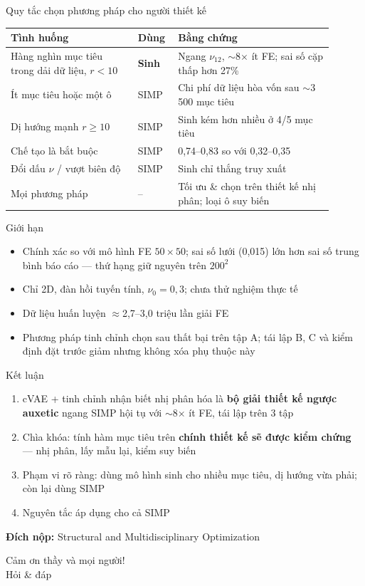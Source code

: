 \documentclass[aspectratio=169,11pt]{beamer}
\newcommand{\nuot}{\nu_{12}}
\begin{document}
\begin{frame}{Quy tắc chọn phương pháp cho người thiết kế}
  \centering
  \begin{tabular}{p{0.36\linewidth}p{0.1\linewidth}p{0.44\linewidth}}
    \toprule
    Tình huống & Dùng & Bằng chứng\\
    \midrule
    Hàng nghìn mục tiêu trong dải dữ liệu, $r<10$
      & \textbf{Sinh} & Ngang $\nuot$, $\sim$8$\times$ ít FE; sai số cặp thấp hơn 27\%\\
    Ít mục tiêu hoặc một ô & SIMP & Chi phí dữ liệu hòa vốn sau
      $\sim$3\,500 mục tiêu\\
    Dị hướng mạnh $r\ge10$ & SIMP & Sinh kém hơn nhiều ở 4/5 mục tiêu\\
    Chế tạo là bắt buộc & SIMP & 0,74--0,83 so với 0,32--0,35\\
    Đổi dấu $\nu$ / vượt biên độ & SIMP & Sinh chỉ thắng truy xuất\\
    Mọi phương pháp & -- & Tối ưu \& chọn trên thiết kế nhị phân; loại ô
      suy biến\\
    \bottomrule
  \end{tabular}
\end{frame}

\begin{frame}{Giới hạn}
  \begin{itemize}
    \item Chính xác so với mô hình FE $50\times50$; sai số lưới (0,015) lớn
      hơn sai số trung bình báo cáo --- thứ hạng giữ nguyên trên $200^2$
    \item Chỉ 2D, đàn hồi tuyến tính, $\nu_0=0{,}3$; chưa thử nghiệm thực tế
    \item Dữ liệu huấn luyện $\approx$2,7--3,0 triệu lần giải FE
    \item Phương pháp tinh chỉnh chọn sau thất bại trên tập A; tái lập B, C
      và kiểm định đặt trước giảm nhưng không xóa phụ thuộc này
  \end{itemize}
\end{frame}

\begin{frame}{Kết luận}
  \begin{enumerate}
    \item cVAE + tinh chỉnh nhận biết nhị phân hóa là \textbf{bộ giải thiết kế
      ngược auxetic} ngang SIMP hội tụ với $\sim$8$\times$ ít FE, tái lập trên
      3 tập
    \item Chìa khóa: tính hàm mục tiêu trên \textbf{chính thiết kế sẽ được
      kiểm chứng} --- nhị phân, lấy mẫu lại, kiểm suy biến
    \item Phạm vi rõ ràng: dùng mô hình sinh cho nhiều mục tiêu, dị hướng
      vừa phải; còn lại dùng SIMP
    \item Nguyên tắc áp dụng cho cả SIMP
  \end{enumerate}
  \vspace{4mm}
  \textbf{Đích nộp:} Structural and Multidisciplinary Optimization
\end{frame}

\begin{frame}
  \centering
  \vfill
  {\Huge Cảm ơn thầy và mọi người!}\\[6mm]
  {\large Hỏi \& đáp}
  \vfill
\end{frame}
\end{document}
